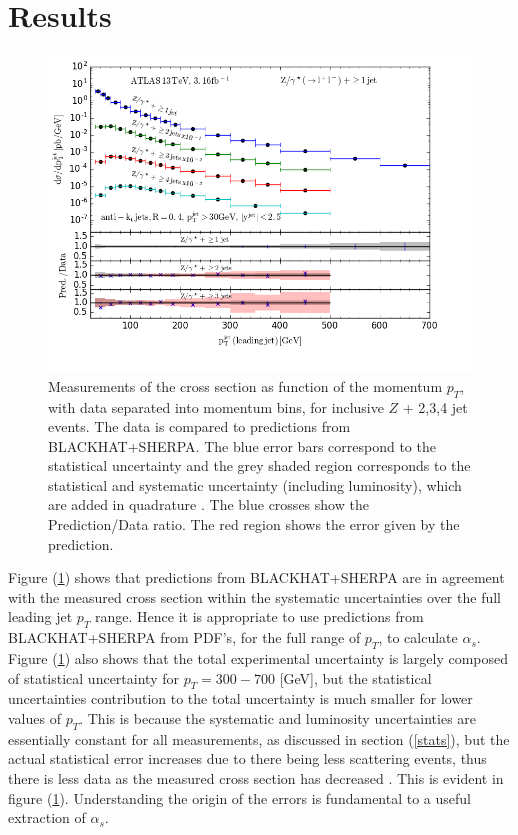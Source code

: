 \documentclass[12pt, onecolumn, nofootinbib]{revtex4}    %
\begin{document}
{\section{Results} \label{Results}
\begin{figure} 
	\begin{center}
		\includegraphics[width=1 \textwidth]{xsection_118CT10.png}

		\caption{Measurements of the cross section as function of the momentum ${p_T}$, with data separated into momentum bins, for inclusive ${Z}$ + 2,3,4 jet events. The data is compared to predictions from BLACKHAT+SHERPA. The blue error bars correspond to the statistical uncertainty and the grey shaded region corresponds to the statistical and systematic uncertainty (including luminosity), which are added in quadrature \cite{HEPD}. The blue crosses show the Prediction/Data ratio. The red region shows the error given by the prediction.}
		\label{xsection}
	\end{center}
\end{figure}
Figure (\ref{xsection}) shows that predictions from BLACKHAT+SHERPA are in agreement with the measured cross section within the systematic uncertainties over the full leading jet ${p_T}$ range. Hence it is appropriate to use predictions from BLACKHAT+SHERPA  from PDF's, for the full range of ${p_T}$, to calculate ${\alpha_s}$. Figure (\ref{xsection}) also shows that the total experimental uncertainty is largely composed of statistical uncertainty for ${p_T = 300-700}$ [GeV], but the statistical uncertainties contribution to the total uncertainty is much smaller for lower values of ${p_T}$. This is because the systematic and luminosity uncertainties are essentially constant for all measurements, as discussed in section (\ref{stats}), but the actual statistical error increases due to there being less scattering events, thus there is less data as the measured cross section has decreased \cite{HEPD}. This is evident in figure (\ref{xsection}). Understanding the origin of the errors is fundamental to a useful extraction of ${\alpha_s}$.
	
}
\end{document}
